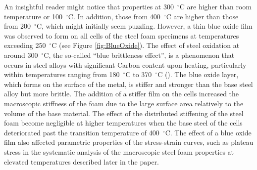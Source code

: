 \documentclass[review]{elsarticle}
\begin{document}
An insightful reader might notice that properties at 300~$^\circ\mathrm{C}$ are higher than room temperature or 100~$^\circ\mathrm{C}$. In addition, those from 400~$^\circ\mathrm{C}$ are higher than those from 200~$^\circ\mathrm{C}$, which might initially seem puzzling. However, a thin blue oxide film was observed to form on all cells of the steel foam specimens at temperatures exceeding 250~$^\circ\mathrm{C}$ (see Figure \ref{fig:BlueOxide}). The effect of steel oxidation at around 300~$^\circ\mathrm{C}$, the so-called ``blue brittleness effect'', is a phenomenon that occurs in steel alloys with significant Carbon content upon heating, particularly within temperatures ranging from 180~$^\circ\mathrm{C}$ to 370~$^\circ\mathrm{C}$ (\cite{XiongandLiew2016}). The blue oxide layer, which forms on the surface of the metal, is stiffer and stronger than the base steel alloy but more brittle. The addition of a stiffer film on the cells increased the macroscopic stiffness of the foam due to the large surface area relatively to the volume of the base material. The effect of the distributed stiffening of the steel foam become negligible at higher temperatures when the base steel of the cells deteriorated past the transition temperature of 400~$^\circ\mathrm{C}$. The effect of a blue oxide film also affected parametric properties of the stress-strain curves, such as plateau stress in the systematic analysis of the macroscopic steel foam properties at elevated temperatures described later in the paper.
\end{document}
